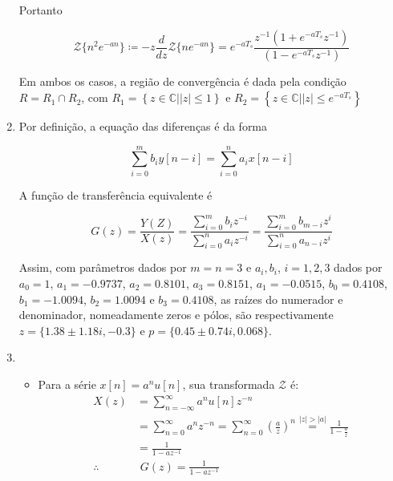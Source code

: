\begin{enumerate}
        Portanto 
        
            \begin{equation}
                \mathcal{Z}\{n^2 e^{-a n}\} \coloneqq -z \frac{d}{dz} \mathcal{Z}\{n e^{-a n}\} = e^{-a T_s} \frac{z^{-1}(1 + e^{-a T_s} z^{-1})}{(1 - e^{-a T_s} z^{-1})}
            \end{equation}
        
        Em ambos os casos, a região de convergência é dada pela condição $R = R_1 \cap R_2$, com $R_1 = \left\{z \in \mathbb{C} | |z| \leq 1 \right\}$ e $R_2 = \left\{z \in \mathbb{C} | |z| \leq e^{-a T_s} \right\}$
        
        \item %
        
        Por definição, a equação das diferenças é da forma
        
            \begin{equation}
                \sum_{i=0}^{m} b_i y[n-i] = \sum_{i=0}^{n} a_i x[n-i]
            \end{equation}
        
        A função de transferência equivalente é
        
            \begin{equation}
                G(z) = \frac{Y(Z)}{X(z)} = \frac{\sum_{i=0}^{m} b_{i} z^{-i}}{\sum_{i=0}^{n} a_{i} z^{-i}} = \frac{\sum_{i=0}^{m} b_{m-i} z^{i}}{\sum_{i=0}^{n} a_{n-i} z^{i}}
            \end{equation}
        
        Assim, com parâmetros dados por $m = n = 3$ e $a_i, b_i$, $i = 1, 2, 3$ dados por $a_0 = 1$, $a_1 = -0.9737$, $a_2 = 0.8101$, $a_3 = 0.8151$, $a_1 = -0.0515$, $b_0 = 0.4108$, $b_1 = -1.0094$, $b_2 = 1.0094$ e $b_3 = 0.4108$, as raízes do numerador e denominador, nomeadamente zeros e pólos, são respectivamente $z = \{1.38 \pm 1.18 i, -0.3\}$ e $p = \{0.45 \pm 0.74i, 0.068\}$.
        
        \item %
        
            \begin{itemize}
                \item Para a série $x[n] = a^n u[n]$, sua transformada $\mathcal{Z}$ é:
                    \begin{equation}
                        \begin{split}
                            X(z) &= \sum_{n = -\infty}^{\infty} a^n u[n] z^{-n} \\
                            & = \sum_{n 
                            = 0}^{\infty} a^n z^{-n} = \sum_{n = 0}^{\infty} (\frac{a}{z})^n \stackrel{|z| > |a|}{=} \frac{1}{1 - \frac{a}{z}} \\
                            &= \frac{1}{1 - a z^{-1}} \\
                            \therefore & \,\, G(z) = \frac{1}{1 - a z^{-1}}
                        \end{split}
                    \label{eq:anun}
                    \end{equation}
                

\end{itemize}
\end{enumerate}
